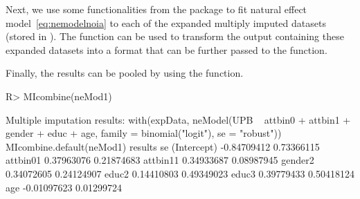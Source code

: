 \documentclass[nojss]{jss}
\begin{document}
Next, we use some functionalities from the  package \citep{R:mitools} to fit natural effect model~\eqref{eq:nemodelnoia} to each of the expanded multiply imputed datasets (stored in ). The function  can be used to transform the output containing these expanded datasets into a format that can be further passed to the  function.
\begin{Schunk}
\end{Schunk}
Finally, the results can be pooled by using the  function.
\begin{Schunk}
\begin{Sinput}
R> MIcombine(neMod1)
\end{Sinput}
\begin{Soutput}
Multiple imputation results:
      with(expData, neModel(UPB ~ attbin0 + attbin1 + gender + educ + 
    age, family = binomial("logit"), se = "robust"))
      MIcombine.default(neMod1)
                results         se
(Intercept) -0.84709412 0.73366115
attbin01     0.37963076 0.21874683
attbin11     0.34933687 0.08987945
gender2      0.34072605 0.24124907
educ2        0.14410803 0.49349023
educ3        0.39779433 0.50418124
age         -0.01097623 0.01299724
\end{Soutput}
\end{Schunk}
\end{document}
